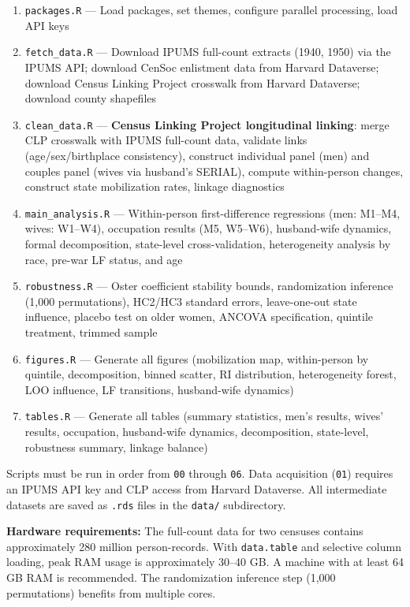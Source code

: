 \documentclass[12pt]{article}
\begin{document}
\begin{enumerate}
\item[\texttt{00}] \texttt{packages.R} --- Load packages, set themes, configure parallel processing, load API keys
\item[\texttt{01}] \texttt{fetch\_data.R} --- Download IPUMS full-count extracts (1940, 1950) via the IPUMS API; download CenSoc enlistment data from Harvard Dataverse; download Census Linking Project crosswalk from Harvard Dataverse; download county shapefiles
\item[\texttt{02}] \texttt{clean\_data.R} --- \textbf{Census Linking Project longitudinal linking}: merge CLP crosswalk with IPUMS full-count data, validate links (age/sex/birthplace consistency), construct individual panel (men) and couples panel (wives via husband's SERIAL), compute within-person changes, construct state mobilization rates, linkage diagnostics
\item[\texttt{03}] \texttt{main\_analysis.R} --- Within-person first-difference regressions (men: M1--M4, wives: W1--W4), occupation results (M5, W5--W6), husband-wife dynamics, formal decomposition, state-level cross-validation, heterogeneity analysis by race, pre-war LF status, and age
\item[\texttt{04}] \texttt{robustness.R} --- Oster coefficient stability bounds, randomization inference (1,000 permutations), HC2/HC3 standard errors, leave-one-out state influence, placebo test on older women, ANCOVA specification, quintile treatment, trimmed sample
\item[\texttt{05}] \texttt{figures.R} --- Generate all figures (mobilization map, within-person by quintile, decomposition, binned scatter, RI distribution, heterogeneity forest, LOO influence, LF transitions, husband-wife dynamics)
\item[\texttt{06}] \texttt{tables.R} --- Generate all tables (summary statistics, men's results, wives' results, occupation, husband-wife dynamics, decomposition, state-level, robustness summary, linkage balance)
\end{enumerate}

Scripts must be run in order from \texttt{00} through \texttt{06}. Data acquisition (\texttt{01}) requires an IPUMS API key and CLP access from Harvard Dataverse. All intermediate datasets are saved as \texttt{.rds} files in the \texttt{data/} subdirectory.

\textbf{Hardware requirements:} The full-count data for two censuses contains approximately 280 million person-records. With \texttt{data.table} and selective column loading, peak RAM usage is approximately 30--40 GB. A machine with at least 64 GB RAM is recommended. The randomization inference step (1,000 permutations) benefits from multiple cores.
\end{document}
